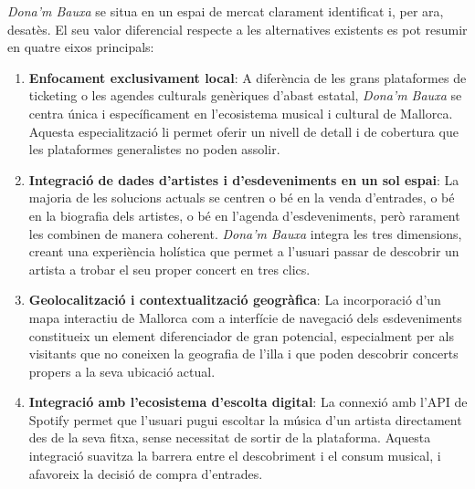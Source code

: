\textit{Dona'm Bauxa} se situa en un espai de mercat clarament identificat i, per ara, desatès. El seu valor diferencial respecte a les alternatives existents es pot resumir en quatre eixos principals:

\begin{enumerate}
    \item \textbf{Enfocament exclusivament local}: A diferència de les grans plataformes de ticketing o les agendes culturals genèriques d'abast estatal, \textit{Dona'm Bauxa} se centra única i específicament en l'ecosistema musical i cultural de Mallorca. Aquesta especialització li permet oferir un nivell de detall i de cobertura que les plataformes generalistes no poden assolir.

    \item \textbf{Integració de dades d'artistes i d'esdeveniments en un sol espai}: La majoria de les solucions actuals se centren o bé en la venda d'entrades, o bé en la biografia dels artistes, o bé en l'agenda d'esdeveniments, però rarament les combinen de manera coherent. \textit{Dona'm Bauxa} integra les tres dimensions, creant una experiència holística que permet a l'usuari passar de descobrir un artista a trobar el seu proper concert en tres clics.

    \item \textbf{Geolocalització i contextualització geogràfica}: La incorporació d'un mapa interactiu de Mallorca com a interfície de navegació dels esdeveniments constitueix un element diferenciador de gran potencial, especialment per als visitants que no coneixen la geografia de l'illa i que poden descobrir concerts propers a la seva ubicació actual.

    \item \textbf{Integració amb l'ecosistema d'escolta digital}: La connexió amb l'API de Spotify permet que l'usuari pugui escoltar la música d'un artista directament des de la seva fitxa, sense necessitat de sortir de la plataforma. Aquesta integració suavitza la barrera entre el descobriment i el consum musical, i afavoreix la decisió de compra d'entrades.
\end{enumerate}
